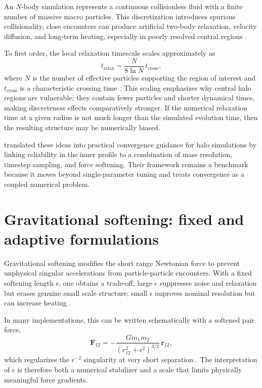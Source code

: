 An $N$-body simulation represents a continuous collisionless fluid with a finite number of massive macro particles. This discretization introduces spurious collisionality, close encounters can produce artificial two-body relaxation, velocity diffusion, and long-term heating, especially in poorly resolved central regions \citep{binney2008galactic,power2003inner}.

To first order, the local relaxation timescale scales approximately as
\begin{equation}
t_{\mathrm{relax}} \sim \frac{N}{8\ln N}\,t_{\mathrm{cross}},
\end{equation}
where $N$ is the number of effective particles supporting the region of interest and $t_{\mathrm{cross}}$ is a characteristic crossing time \citep{binney2008galactic}. This scaling emphasizes why central halo regions are vulnerable; they contain fewer particles and shorter dynamical times, making discreteness effects comparatively stronger. If the numerical relaxation time at a given radius is not much longer than the simulated evolution time, then the resulting structure may be numerically biased.

\cite{power2003inner} translated these ideas into practical convergence guidance for halo simulations by linking reliability in the inner profile to a combination of mass resolution, timestep sampling, and force softening. Their framework remains a benchmark because it moves beyond single-parameter tuning and treats convergence as a coupled numerical problem.

\section{Gravitational softening: fixed and adaptive formulations}
\label{sec:bg_softening}

Gravitational softening modifies the short range Newtonian force to prevent unphysical singular accelerations from particle-particle encounters. With a fixed softening length $\epsilon$, one obtains a trade-off, large $\epsilon$ suppresses noise and relaxation but erases genuine small scale structure; small $\epsilon$ improves nominal resolution but can increase heating \citep{power2003inner,zhang2019optimal}.

In many implementations, this can be written schematically with a softened pair force,
\begin{equation}
\mathbf{F}_{12} = -\frac{Gm_1m_2}{\left(r_{12}^2+\epsilon^2\right)^{3/2}}\,\mathbf{r}_{12},
\end{equation}
which regularizes the $r^{-2}$ singularity at very short separation \citep{zhang2019optimal}. The interpretation of $\epsilon$ is therefore both a numerical stabilizer and a scale that limits physically meaningful force gradients.


